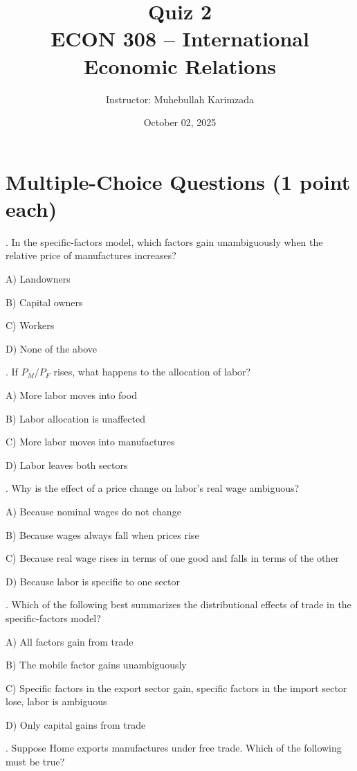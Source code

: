 \documentclass[12pt]{article}
\title{Quiz 2\\ \vspace{8pt} \Large ECON 308 -- International Economic Relations}
\author{Instructor: Muhebullah Karimzada}
\date{October 02,  2025}
\begin{document}
\maketitle

\section*{Multiple-Choice Questions (1 point each)}

. In the specific-factors model, which factors gain unambiguously when the relative price of manufactures increases?  

A) Landowners  

B) Capital owners  

C) Workers  

D) None of the above  

\bigskip

. If $P_M/P_F$ rises, what happens to the allocation of labor?  

A) More labor moves into food  

B) Labor allocation is unaffected  

C) More labor moves into manufactures  

D) Labor leaves both sectors  

\bigskip

. Why is the effect of a price change on labor’s real wage ambiguous?  

A) Because nominal wages do not change  

B) Because wages always fall when prices rise  

C) Because real wage rises in terms of one good and falls in terms of the other  

D) Because labor is specific to one sector  

\bigskip

. Which of the following best summarizes the distributional effects of trade in the specific-factors model?  

A) All factors gain from trade  

B) The mobile factor gains unambiguously  

C) Specific factors in the export sector gain, specific factors in the import sector lose, labor is ambiguous  

D) Only capital gains from trade  

\bigskip
\newpage
{}. Suppose Home exports manufactures under free trade. Which of the following must be true?  
\end{document}
